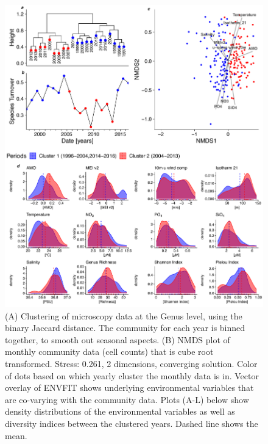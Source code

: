 \documentclass[draft]{agujournal2019}
\begin{document}
\begin{figure}
\label{fig:clustering}
\noindent\includegraphics[width=\textwidth]{fig/ClusteringCompPlot_NEW.pdf}
\caption{(A) Clustering of microscopy data at the Genus level, using the binary Jaccard distance. The community for each year is binned together, to smooth out seasonal aspects. (B) NMDS plot of monthly community data (cell counts) that is cube root transformed. Stress: 0.261, 2 dimensions, converging solution. Color of dots based on which yearly cluster the monthly data is in. Vector overlay of ENVFIT shows underlying environmental variables that are co-varying with the community data.
Plots (A-L) below show density distributions of the environmental variables as well as diversity indices between the clustered years. Dashed line shows the mean.}
\end{figure}
\end{document}
